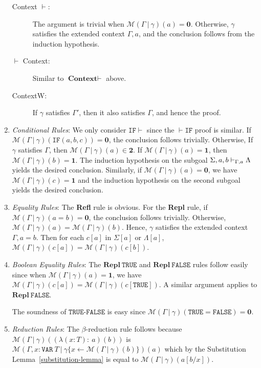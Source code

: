 \documentclass [12pt,twoside]{cslreport}
\newcommand{\thmbox}
   {{\ \hfill\hbox{%
      \vrule width1.0ex height1.0ex
   }\parfillskip 0pt }}
\newenvironment{proof}{{\bf Proof. }}{\thmbox}
\newcommand{\Mgamma}[1]{{\mathcal M}(\Gamma\vbar\gamma)(#1)}
\newcommand{\twob}{\mathbf{2}}
\newcommand{\oneb}{\mathbf{1}}
\newcommand{\zerob}{\mathbf{0}}
\newcommand{\tttrue}{\mathtt{TRUE}}
\newcommand{\ttfalse}{\mathtt{FALSE}}
\newcommand{\ttvar}{\mathtt{VAR}}
\newcommand{\vbar}{\ |\ }
\begin{document}
\begin{proof}
\begin{enumerate}
\begin{description}
\item [Context $\vdash$: ] The argument is trivial when $\Mgamma{a} =
\zerob$.  Otherwise, $\gamma$ satisfies the extended context $\Gamma, a$,
and the conclusion follows from the induction hypothesis.

\item [$\vdash$ Context: ] Similar to $\textbf{Context} \vdash$ above.

\item [ContextW: ]  If $\gamma$ satisfies $\Gamma'$, then it also
satisfies $\Gamma$, and hence the proof.
\end{description}

\item \emph{Conditional Rules}: We only consider $ \mathtt{IF} \vdash$
since the $\vdash \mathtt{IF}$ proof is similar.  If $\Mgamma{
\mathtt{IF}(a, b, c)} = \zerob$, the conclusion follows  trivially.
Otherwise, If $\gamma$ satisfies
$\Gamma$, then $\Mgamma{a}\in \twob$.  If $\Mgamma{a} = \oneb$, then
$\Mgamma{b} = \oneb$.  The induction hypothesis on the subgoal
$\Sigma, a, b\vdash_{\Gamma, a}\Lambda$ yields the desired
conclusion.  Similarly, if $\Mgamma{a} = \zerob$, we have $\Mgamma{c} =
\oneb$
and the induction hypothesis on the second subgoal yields the
desired conclusion.

\item \emph{Equality Rules}: The \textbf{Refl} rule is obvious. 
For the \textbf{Repl} rule, if $\Mgamma{a = b} = \zerob$, the conclusion
follows trivially.  Otherwise, $\Mgamma{a} = \Mgamma{b}$.  Hence, $\gamma$
satisfies the extended context $\Gamma, a = b$.  Then for each
$c[a]$ in $\Sigma[a]$ or $\Lambda[a]$, $\Mgamma{c[a]} = \Mgamma{c[b]}$\@.

\item \emph{Boolean Equality Rules}: The $\mathbf{Repl}~\tttrue$ and
$\mathbf{Repl}~\ttfalse$ rules follow easily since when $\Mgamma{a} =
\oneb$, we have $\Mgamma{c[a]} = \Mgamma{c[\tttrue]}$\@.
A similar argument applies to $\mathbf{Repl}~\ttfalse$\@.

The soundness of $\tttrue\mbox{-}\ttfalse$ is easy since
$\Mgamma{\tttrue = \ttfalse} = \zerob$\@.

\item \emph{Reduction Rules}:  The $\beta$-reduction rule follows because
$\Mgamma{(\lambda (x : T):~a)(b)}$ is
$\mathcal{M}(\Gamma, x : \ttvar~T\vbar \gamma\{x\gets\Mgamma{b}\})(a)$
which by the Substitution Lemma~\ref{substitution-lemma} is
equal to $\Mgamma{a[b/x]}$\@.


\end{enumerate}
\end{proof}
\end{document}

